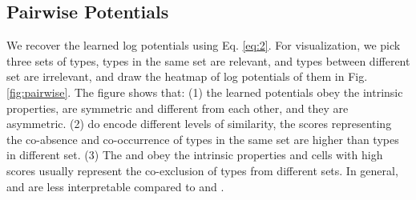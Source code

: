 \documentclass[11pt]{article}
\begin{document}
 \subsection{Pairwise Potentials}
 \label{app:potential}
We recover the learned log potentials  using Eq. \ref{eq:2}. For visualization, we pick three sets of types, types in the same set are relevant, and types between different set are irrelevant, and draw the heatmap of log potentials of them in Fig. \ref{fig:pairwise}. The figure shows that: (1) the learned potentials obey the intrinsic properties,  are symmetric and different from each other,  and they are asymmetric. (2)  do encode different levels of similarity, the scores representing the co-absence and co-occurrence of types in the same set are higher than types in different set. (3) The  and  obey the intrinsic properties and cells with high scores usually represent the co-exclusion of types from different sets. In general,  and  are less interpretable compared to  and .

 \begin{figure*}[h]
     \centering
     \caption{Visualization of pairwise potentials. The horizontal axis is for , and the vertical axis is for , for example, .}
     \label{fig:pairwise}
 \end{figure*}
  
\end{document}
